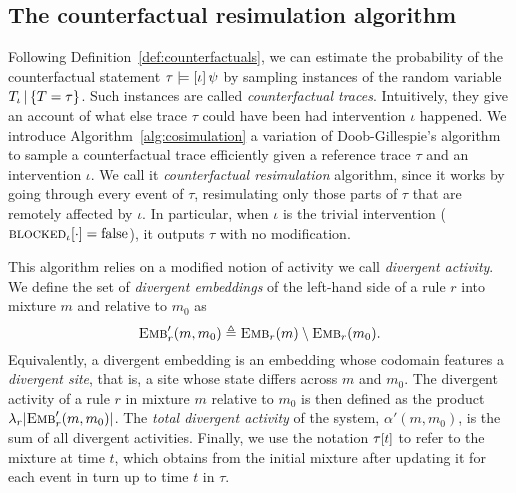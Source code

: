 \subsection{The counterfactual resimulation algorithm}
\label{subsec:cosim-algo}

Following Definition~\ref{def:counterfactuals}, we can estimate the
probability of the counterfactual statement
$\tau \models [\iota] \, \psi{}$ by sampling instances of the random
variable ${T_\iota\,|\,\{T=\tau\}}{}$. Such instances are called \emph{counterfactual
  traces}. Intuitively, they give an account of what else trace $\tau$
could have been had intervention $\iota$ happened.  We introduce
Algorithm~\ref{alg:cosimulation} a variation of Doob-Gillespie's
algorithm to sample a counterfactual trace efficiently given a
reference trace $\tau$ and an intervention $\iota$.  We call it
\emph{counterfactual resimulation} algorithm, since it works by going
through every event of $\tau$, resimulating only those parts of $\tau$
that are remotely affected by $\iota$. In particular, when $\iota$ is
the trivial intervention (${\textsc{blocked}}_{\iota}[\cdot] = \text{false}$), it
outputs $\tau$ with no modification.





This algorithm relies on a modified notion of activity we call
\emph{divergent activity}. We define the set of \emph{divergent
  embeddings} of the left-hand side of a rule $r$ into mixture $m$
and relative to $m_0$ as
\[{\textsc{Emb}}'_{r}(m, m_0) \triangleq {\textsc{Emb}}_{r}(m) \setminus {\textsc{Emb}}_{r}(m_0).\]
Equivalently, a divergent embedding is an embedding whose codomain
features a \emph{divergent site}, that is, a site whose state differs
across $m$ and $m_0$. The {divergent activity} of a rule $r$ in
mixture $m$ relative to $m_0$ is then defined as the product
$\lambda_r|{\textsc{Emb}}'_{r}(m, m_0)|$. The \emph{total divergent activity} of
the system, $\alpha'(m, m_0)$, is the sum of all divergent
activities. Finally, we use the notation $\TSTATE{t}{\tau}$ to refer
to the mixture at time $t$, which obtains from the initial mixture
after updating it for each event in turn up to time $t$ in $\tau$.



